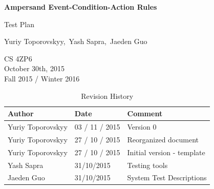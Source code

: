 \documentclass[12pt]{report}
\begin{document}
\begin{titlepage}\begin{center}
\thispagestyle{empty} %

\vspace*{1cm}

{\Huge\textbf{Ampersand Event-Condition-Action Rules}}

\vspace{0.5cm}
{\Large Test Plan

\vspace{1.5cm}
Yuriy Toporovskyy,\ Yash Sapra,\ Jaeden Guo}
\vfill 


\end{center}
CS 4ZP6 \\
October 30th, 2015 \\ 
Fall 2015 / Winter 2016 
\end{titlepage}


\begin{table}[ht!]\begin{center}
\caption{Revision History}  
\begin{tabular}{|l|l|l|}\hline
\textbf{Author} & \textbf{Date} & \textbf{Comment} \\\hline 
Yuriy Toporovskyy & 03 / 11 / 2015 & Version 0 \\\hline
Yuriy Toporovskyy & 27 / 10 / 2015 & Reorganized document \\\hline
Yuriy Toporovskyy & 27 / 10 / 2015 & Initial version - template \\\hline
Yash Sapra & 31/10/2015 & Testing tools \\\hline
Jaeden Guo&31/10/2015&System Test Descriptions \\\hline
\end{tabular}
\end{center}\end{table}

\newpage

\tableofcontents

\newpage
{} %
\end{document}
